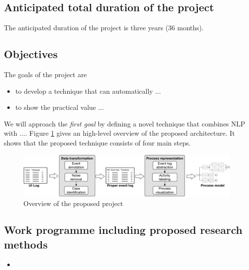  \subsection{Anticipated total duration of the project}

The anticipated duration of the project is three years (36 months).

\subsection{Objectives}
\label{sec:objectives}

The goals of the project are 

\begin{itemize}
	\item to develop a technique that can automatically ...   
	
	\item to show the practical value ... 
\end{itemize}

We will approach the \textit{first goal} by defining a novel technique that combines NLP with .... Figure \ref{fig:approach} gives an high-level overview of the proposed architecture. It shows that the proposed technique consists of four main steps.    

\begin{figure}[h!]
	\centering
	\includegraphics[width=\textwidth]{figures/overview.pdf}
	\caption{Overview of the proposed project}
	\label{fig:approach}
\end{figure}



\subsection{Work programme including proposed research methods}
\label{sec:workprogramme}

\begin{itemize}
	\item {}
\end{itemize}

